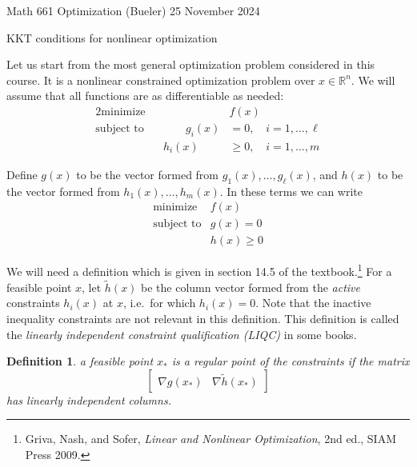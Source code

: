 \documentclass[11pt]{amsart}
\newtheorem*{defn}{Definition}
\newcommand{\RR}{\mathbb{R}}
\newcommand{\grad}{\nabla}
\begin{document}
\scriptsize \noindent Math 661 Optimization (Bueler) \hfill 25 November 2024
\normalsize

\medskip\bigskip
\Large
\centerline{KKT conditions for nonlinear optimization}

\bigskip\medskip
\normalsize

\thispagestyle{empty}

Let us start from the most general optimization problem considered in this course.  It is a nonlinear constrained optimization problem over $x\in\RR^n$.  We will assume that all functions are as differentiable as needed:
\begin{alignat*}{2}
    \text{minimize}   &&  &f(x) \\
    \text{subject to} && \qquad g_i(x) &= 0, \quad i=1,\dots,\ell \\
                      &&       h_i(x) &\ge 0, \quad i=1,\dots,m
\end{alignat*}

Define $g(x)$ to be the vector formed from $g_1(x),\dots,g_\ell(x)$, and $h(x)$ to be the vector formed from $h_1(x),\dots,h_m(x)$.  In these terms we can write
\begin{equation}
\begin{matrix}
    \text{minimize}   & f(x) \\
    \text{subject to} & g(x) = 0 \\
                      & h(x) \ge 0
\end{matrix} \label{prob}
\end{equation}

We will need a definition which is given in section 14.5 of the textbook.\footnote{Griva, Nash, and Sofer, \emph{Linear and Nonlinear Optimization}, 2nd ed., SIAM Press 2009.}  For a feasible point $x$, let $\tilde h(x)$ be the column vector formed from the \emph{active} constraints $h_i(x)$ at $x$, i.e.~for which $h_i(x)=0$. Note that the inactive inequality constraints are not relevant in this definition.  This definition is called the \emph{linearly independent constraint qualification (LIQC)} in some books.

\begin{defn}  a feasible point $x_*$ is a \emph{regular point} of the constraints if the matrix
    $$\begin{bmatrix}
    \grad g(x_*) & \grad {\tilde h}(x_*)
    \end{bmatrix}$$
has linearly independent columns.
\end{defn}
\end{document}
